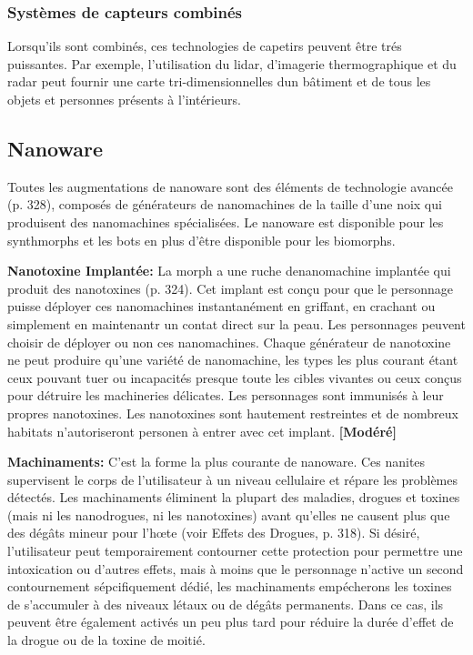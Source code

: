 \subsubsection{Systèmes de capteurs combinés} 

Lorsqu'ils sont combinés, ces technologies de capetirs peuvent être trés puissantes. Par exemple, l'utilisation du lidar, d'imagerie thermographique et du radar peut fournir une carte tri-dimensionnelles dun bâtiment et de tous les objets et personnes présents à l'intérieurs. 

\subsection{Nanoware} \label{sec:nanoware} 

Toutes les augmentations de nanoware sont des éléments de technologie avancée (p. 328), composés de générateurs de nanomachines de la taille d'une noix qui produisent des nanomachines spécialisées. Le nanoware est disponible pour les synthmorphs et les bots en plus d'être disponible pour les biomorphs. 

\textbf{Nanotoxine Implantée:} La morph a une ruche denanomachine implantée qui produit des nanotoxines (p. 324). Cet implant est conçu pour que le personnage puisse déployer ces nanomachines instantanément en griffant, en crachant ou simplement en maintenantr un contat direct sur la peau. Les personnages peuvent choisir de déployer ou non ces nanomachines. Chaque générateur de nanotoxine ne peut produire qu'une variété de nanomachine, les types les plus courant étant ceux pouvant tuer ou incapacités presque toute les cibles vivantes ou ceux conçus pour détruire les machineries délicates. Les personnages sont immunisés à leur propres nanotoxines. Les nanotoxines sont hautement restreintes et de nombreux habitats n'autoriseront personen à entrer avec cet implant. \textbf{[Modéré]} 

\textbf{Machinaments:} C'est la forme la plus courante de nanoware. Ces nanites supervisent le corps de l'utilisateur à un niveau cellulaire et répare les problèmes détectés. Les machinaments éliminent la plupart des maladies, drogues et toxines (mais ni les nanodrogues, ni les nanotoxines) avant qu'elles ne causent plus que des dégâts mineur pour l'hœte (voir Effets des Drogues, p. 318). Si désiré, l'utilisateur peut temporairement contourner cette protection pour permettre une intoxication ou d'autres effets, mais à moins que le personnage n'active un second contournement sépcifiquement dédié, les machinaments empécherons les toxines de s'accumuler à des niveaux létaux ou de dégâts permanents. Dans ce cas, ils peuvent être également activés un peu plus tard pour réduire la durée d'effet de la drogue ou de la toxine de moitié. 

